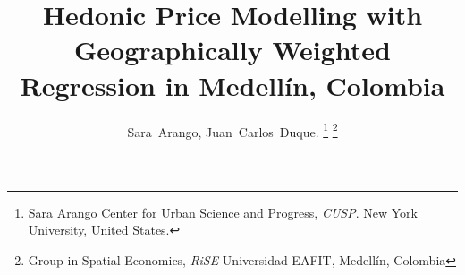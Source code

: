 \documentclass[journal]{IEEEtran}
\begin{document}
%
\title{Hedonic Price Modelling with Geographically Weighted Regression in Medellín, Colombia}
%
%
%

\author{Sara~Arango,
        Juan~Carlos~Duque.%
\thanks{Sara Arango Center for Urban Science and Progress, \textit{CUSP}. 
New York University, United States.}%
\thanks{Group in Spatial Economics, \textit{RiSE} 
Universidad EAFIT, Medellín, Colombia}}

% 
%



% 
\end{document}
